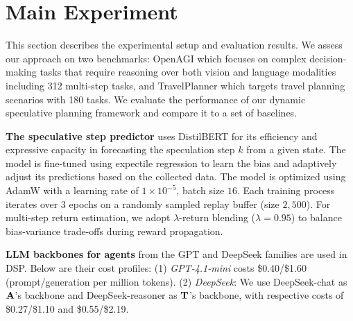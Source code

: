 \section{Main Experiment}
This section describes the experimental setup and evaluation results. We assess our approach on two benchmarks: OpenAGI \citep{ge2024openagi} which focuses on complex decision-making tasks that require reasoning over both vision and language modalities including 312 multi-step tasks, and TravelPlanner \citep{xie2024travelplanner} which targets travel planning scenarios with 180 tasks. We evaluate the performance of our dynamic speculative planning framework and compare it to a set of baselines.


\textbf{The speculative step predictor} uses DistilBERT for its efficiency and expressive capacity in forecasting the speculation step $k$ from a given state. The model is fine-tuned using expectile regression to learn the bias and adaptively adjust its predictions based on the collected data. The model is optimized using AdamW with a learning rate of $1\times10^{-5}$, batch size $16$. Each training process iterates over $3$ epochs on a randomly sampled replay buffer (size $2,\!500$). For multi-step return estimation, we adopt $\lambda$-return blending ($\lambda=0.95$) to balance bias-variance trade-offs during reward propagation. 

\textbf{LLM backbones for agents} from the GPT and DeepSeek families are used in DSP. Below are their cost profiles:
(1) \emph{GPT-4.1-mini} costs \$0.40/\$1.60 (prompt/generation per million tokens).
(2) \emph{DeepSeek}: We use DeepSeek-chat as ${\mathbf{A}}$'s backbone and DeepSeek-reasoner as ${\mathbf{T}}$'s backbone, with respective costs of \$0.27/\$1.10 and \$0.55/\$2.19.


